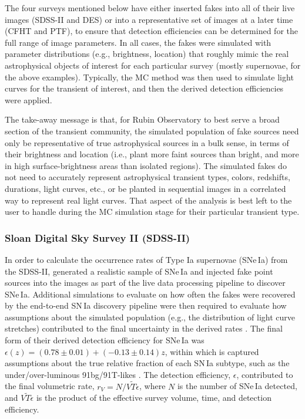 The four surveys mentioned below have either inserted fakes into all of their live images (SDSS-II and DES) or into a representative set of images at a later time (CFHT and PTF), to ensure that detection efficiencies can be determined for the full range of image parameters.
In all cases, the fakes were simulated with parameter distributions (e.g., brightness, location) that roughly mimic the real astrophysical objects of interest for each particular survey (mostly supernovae, for the above examples).
Typically, the MC method was then used to simulate light curves for the transient of interest, and then the derived detection efficiencies were applied.

The take-away message is that, for Rubin Observatory to best serve a broad section of the transient community, the simulated population of fake sources need only be representative of true astrophysical sources in a bulk sense, in terms of their brightness and location (i.e., plant more faint sources than bright, and more in high surface-brightness areas than isolated regions).
The simulated fakes do not need to accurately represent astrophysical transient types, colors, redshifts, durations, light curves, etc., or be planted in sequential images in a correlated way to represent real light curves.
That aspect of the analysis is best left to the user to handle during the MC simulation stage for their particular transient type. 

\subsubsection{Sloan Digital Sky Survey II (SDSS-II)}

In order to calculate the occurrence rates of Type Ia supernovae (SNe\,Ia) from the SDSS-II, \cite{2008AJ....135..348S} generated a realistic sample of SNe\,Ia and injected fake point sources into the images as part of the live data processing pipeline to discover SNe\,Ia.
Additional simulations to evaluate on how often the fakes were recovered by the end-to-end SN\,Ia discovery pipeline were then required to evaluate how assumptions about the simulated population (e.g., the distribution of light curve stretches) contributed to the final uncertainty in the derived rates \citep{2008ApJ...682..262D}.
The final form of their derived detection efficiency for SNe\,Ia was $\epsilon(z) = (0.78 \pm 0.01) + (-0.13 \pm 0.14)z$, within which is captured assumptions about the true relative fraction of each SN\,Ia subtype, such as the under/over-luminous 91bg/91T-likes \citep{2008ApJ...682..262D}.
The detection efficiency, $\epsilon$, contributed to the final volumetric rate, $r_V = N / \widetilde{VT\epsilon}$, where $N$ is the number of SNe\,Ia detected, and $\widetilde{VT\epsilon}$ is the product of the effective survey volume, time, and detection efficiency.

